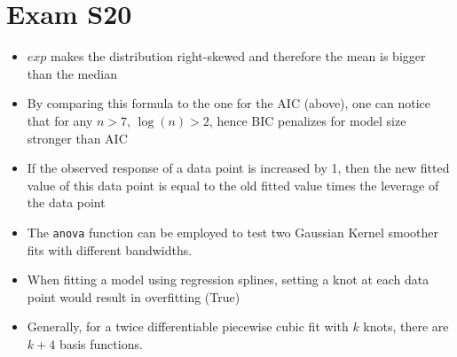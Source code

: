\documentclass[a4paper]{article}
\begin{document}
\section{Exam S20}
\begin{itemize}
    \item $exp$ makes the distribution right-skewed and therefore the mean is bigger than the median
    \item By comparing this formula to the one for the AIC (above), one can notice that for any $n>7$, $\log(n)>2$, hence BIC penalizes for model size stronger than AIC
    \item If the observed response of a data point is increased by 1, then the new fitted value of this data point is equal to the old fitted value times the leverage of the data point
    \item The \texttt{anova} function can be employed to test two Gaussian Kernel smoother fits with different bandwidths.
    \item When fitting a model using regression splines, setting a knot at each data point would result in overfitting (True)
    \item Generally, for a twice differentiable piecewise cubic fit with $k$ knots, there are $k+4$ basis functions.
\end{itemize}
\end{document}

